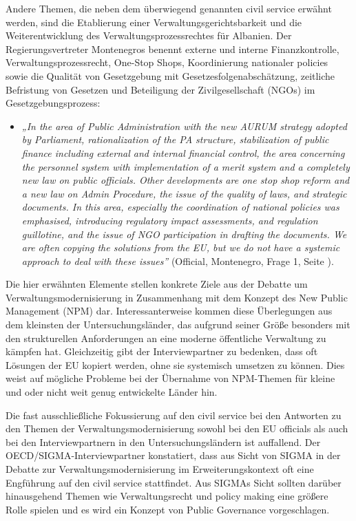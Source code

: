 Andere Themen, die neben dem überwiegend genannten civil service erwähnt werden, sind die Etablierung einer Verwaltungsgerichtsbarkeit und die Weiterentwicklung des Verwaltungsprozessrechtes für Albanien. Der Regierungsvertreter Montenegros benennt externe und interne Finanzkontrolle, Verwaltungsprozessrecht, One-Stop Shops, Koordinierung nationaler policies sowie die Qualität von Gesetzgebung mit Gesetzesfolgenabschätzung, zeitliche Befristung von Gesetzen und Beteiligung der Zivilgesellschaft (NGOs) im Gesetzgebungsprozess:
\begin{itemize}[label={}]
\item \textit{„In the area of Public Administration with the new AURUM strategy adopted by Parliament, rationalization of the PA structure, stabilization of public finance including external and internal financial control, the area concerning the personnel system with implementation of a merit system and a completely new law on public officials. Other developments are one stop shop reform and a new law on Admin Procedure, the issue of the quality of laws, and strategic documents. In this area, especially the coordination of national policies was emphasised, introducing regulatory impact assessments, and regulation guillotine, and the issue of NGO participation in drafting the documents. We are often copying the solutions from the EU, but we do not have a systemic approach to deal with these issues”} (Official, Montenegro, Frage 1, Seite \pageref{sec:par macedonia}).
\end{itemize}
Die hier erwähnten Elemente stellen konkrete Ziele aus der Debatte um Verwaltungsmodernisierung in Zusammenhang mit dem Konzept des New Public Management (NPM) dar. Interessanterweise kommen diese Überlegungen aus dem kleinsten der Untersuchungsländer, das aufgrund seiner Größe besonders mit den strukturellen Anforderungen an eine moderne öffentliche Verwaltung zu kämpfen hat. Gleichzeitig gibt der Interviewpartner zu bedenken, dass oft Lösungen der EU kopiert werden, ohne sie systemisch umsetzen zu können. Dies weist auf mögliche Probleme bei der Übernahme von NPM-Themen für kleine und oder nicht weit genug entwickelte Länder hin.\par
Die fast ausschließliche Fokussierung auf den civil service bei den Antworten zu den Themen der Verwaltungsmodernisierung sowohl bei den EU officials als auch bei den Interviewpartnern in den Untersuchungsländern ist auffallend. Der OECD/SIGMA-Interviewpartner konstatiert, dass aus Sicht von SIGMA in der Debatte zur Verwaltungsmodernisierung im Erweiterungskontext oft eine Engführung auf den civil service stattfindet. Aus SIGMAs Sicht sollten darüber hinausgehend Themen wie Verwaltungsrecht und policy making eine größere Rolle spielen und es wird ein Konzept von Public Governance vorgeschlagen.
